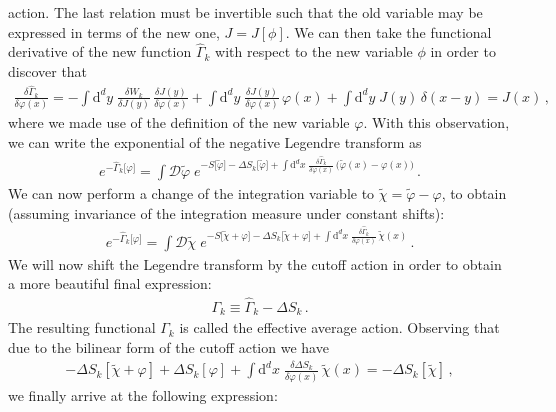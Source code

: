 \documentclass[11pt]{book}
\numberwithin{equation}{chapter}
\begin{document}
action. The last relation must be invertible such that the old
variable may be expressed in terms of the new one, $J=J[\phi]$.
We can then take the functional derivative of the new function
$\hat \Gamma_k$ with respect to the new variable $\phi$ in order
to discover that
\begin{align}
  \frac{ \delta \hat \Gamma_k }{ \delta \varphi (x) }
  = - \int \mathrm d^dy \; \frac{ \delta W_k }{ \delta J(y) } \,
  \frac{ \delta J(y) }{ \delta \varphi(x) }
  + \int \mathrm d^dy \; \frac{ \delta J(y) }{ \delta \varphi(x) } \, \varphi(x)
  + \int \mathrm d^dy \; J(y) \, \delta(x-y)
  = J(x) \,,
\end{align}
where we made use of the definition of the new variable $\varphi$.
With this observation,
we can write the exponential of the negative Legendre transform as
\begin{align}
  e^{ - \hat \Gamma_k \lbrack \varphi \rbrack }
  = \int \mathcal D \tilde \varphi \;
  e^{
    - S \lbrack \tilde \varphi \rbrack
    - \Delta S_k \lbrack \tilde \varphi \rbrack
    + \int \mathrm d^dx \;
    \frac{ \delta \hat \Gamma_k }{ \delta \varphi (x) }
    \, \big( \tilde \varphi(x) - \varphi(x) \big)
  } \,.
\end{align}
We can now perform a change of the integration variable
to $\tilde \chi = \tilde \varphi - \varphi$, to obtain
(assuming invariance of the integration measure under
constant shifts):
\begin{align}
  e^{ - \hat \Gamma_k \lbrack \varphi \rbrack }
  = \int \mathcal D \tilde \chi \;
  e^{
    - S \lbrack \tilde \chi + \varphi \rbrack
    - \Delta S_k \lbrack \tilde \chi + \varphi \rbrack
    + \int \mathrm d^dx \;
    \frac{ \delta \hat \Gamma_k }{ \delta \varphi (x) }
    \, \tilde \chi(x)
  } \,.
\end{align}
We will now shift the Legendre transform by the
cutoff action in order to obtain a more beautiful final
expression:
\begin{align}
  \Gamma_k \equiv \hat \Gamma_k - \Delta S_k \,.
\end{align}
The resulting functional $\Gamma_k$ is called the
effective average action.
Observing that due to the bilinear form of the cutoff action
we have
\begin{align}
  - \Delta S_k [ \tilde \chi + \varphi ]
  + \Delta S_k [ \varphi ]
  + \int \mathrm d^dx \;
  \frac{ \delta \Delta S_k }{ \delta \varphi (x) }
  \, \tilde \chi(x)
  = - \Delta S_k [ \tilde \chi ] \,,
\end{align}
we finally arrive at the following expression:
\end{document}
